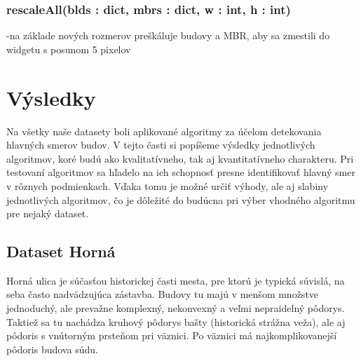 \documentclass[12pt]{article}
\begin{document}
\subsubsection*{rescaleAll(blds : dict, mbrs : dict, w : int, h : int)}
\noindent-na základe nových rozmerov preškáluje budovy a MBR, aby sa zmestili do widgetu s  posunom 5 pixelov
\newpage
\section*{Výsledky}
Na všetky naše datasety boli aplikované algoritmy za účelom detekovania hlavných smerov budov. V tejto časti si popíšeme výsledky jednotlivých algoritmov, koré budú ako kvalitatívneho, tak aj kvantitatívneho charakteru. Pri testovaní algoritmov sa hľadelo na ich schopnosť presne identifikovať hlavný smer v rôznych podmienkach. Vďaka tomu je možné určiť výhody, ale aj slabiny jednotlivých algoritmov, čo je dôležité do budúcna pri výber vhodného algoritmu pre nejaký dataset.
\subsection*{Dataset Horná}
Horná ulica je súčasťou historickej časti mesta, pre ktorú je typická súvislá, na seba často nadvädzujúca zástavba. Budovy tu majú v menšom množstve jednoduchý, ale prevažne komplexný, nekonvexný a veľmi nepraidelný pôdorys. Taktiež sa tu nachádza kruhový pôdorys bašty (historická strážna veža), ale aj pôdoris s vnútorným prsteňom pri väznici. Po väznici má najkomplikovanejší pôdoris budova súdu.
\end{document}
